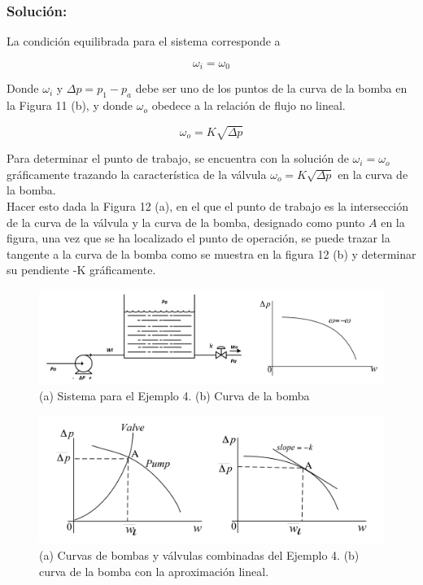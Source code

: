 \documentclass[a4paper,12pt,twoside]{proyectotanquesecci}
\begin{document}
\subsubsection{Solución:}

La condición equilibrada para el sistema corresponde a 

\begin{equation}
\omega _{i}=\omega _{0}
\end{equation}

Donde $\omega_{i}$ y $\Delta p=p_{1}-p_{a}$ debe ser uno de los puntos de la curva de la bomba en la Figura 11 (b), y donde $\omega_{o}$ obedece a la relación de flujo no lineal.

\begin{equation}
\omega_{o}=K\sqrt{\Delta p}
\end{equation}

Para determinar el punto de trabajo, se encuentra con la solución de $\omega_{i}=\omega_{o}$ gráficamente trazando la característica de la válvula  $\omega_{o}=K\sqrt{\Delta p}$  en la curva de la bomba. \\

Hacer esto dada la Figura 12 (a), en el que el punto de trabajo es la intersección de la curva de la válvula y la curva de la bomba, designado como punto $A$ en la figura, una vez que se ha localizado el punto de operación, se puede trazar la tangente a la curva de la bomba como se muestra en la figura 12 (b) y determinar su pendiente -K gráficamente.

\begin{figure}[h]
\centering
\includegraphics[scale=0.6]{Figura10}
\renewcommand{\figurename}{Fig.}
\caption{(a) Sistema para el Ejemplo 4. (b) Curva de la bomba}
\label{(a) Sistema para el Ejemplo 4. (b) Curva de la bomba}
\end{figure}

\begin{figure}[h]
\centering
\includegraphics[scale=0.5]{Figura11}
\renewcommand{\figurename}{Fig.}
\caption{(a) Curvas de bombas y válvulas combinadas del Ejemplo 4. (b) curva de la bomba con la aproximación lineal.}
\label{(a) Curvas de bombas y válvulas combinadas del Ejemplo 4. (b) curva de la bomba con la aproximación lineal.}
\end{figure}
\end{document}

